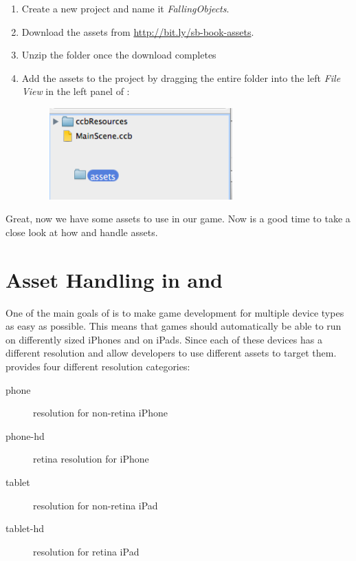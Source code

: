 \begin{leftbar}
\begin{enumerate}
  \item Create a new \SB{} project and name it \textit{FallingObjects}.
  \item Download the assets from
  \url{http://bit.ly/sb-book-assets}.
  \item Unzip the folder once the download completes
  \item Add the assets to the project by dragging the
entire folder into the left \textit{File View} in the left panel of
\SB{}:
\begin{figure}[H]
    \centering
    \includegraphics[width=200pt]{images/Chapter2/DragAssets.png}
\end{figure}
\end{enumerate}
\end{leftbar}

Great, now we have some assets to use in our game. Now is a good time to take a
close look at how \SB{} and \cocos{} handle assets.

\section{Asset Handling in \SB{} and \cocos{}}
One of the main goals of \SB{} is to make game development for multiple device
types as easy as possible. This means that games should automatically be able to
run on differently sized iPhones and on iPads. Since each of these
devices has a different resolution \cocos{} and \SB{} allow developers to use different assets to target them. \SB{}
provides four different resolution categories:
\begin{description}
\item[phone] resolution for non-retina iPhone
\item[phone-hd] retina resolution for iPhone
\item[tablet] resolution for non-retina iPad
\item[tablet-hd] resolution for retina iPad
\end{description}

